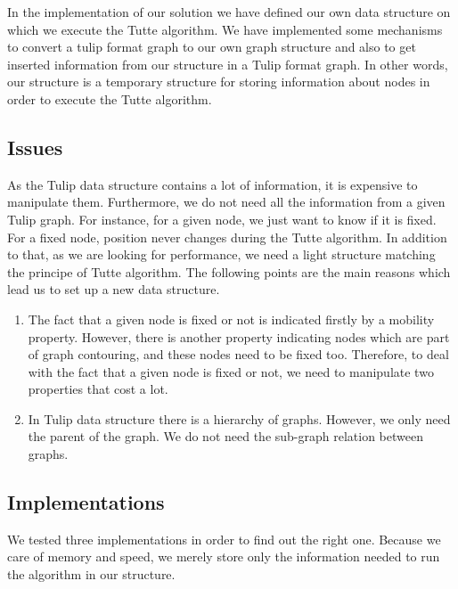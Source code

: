 In the implementation of our solution we have defined our own data
structure on which we execute the Tutte algorithm. We have
implemented some mechanisms to convert a tulip format graph to our own
graph structure and also to get inserted information from our structure
 in a Tulip format graph. In other words, our structure is a
temporary structure for storing information about nodes in order to
execute the Tutte algorithm.

\subsection{Issues}
As the Tulip data structure contains a lot of information, it is
expensive to manipulate them. Furthermore, we do not need all the
information from a given Tulip graph. For
instance, for a given node, we just want to know if it is fixed. For a
fixed node, position never changes during the Tutte algorithm. In
addition to that, as we are looking for performance, we need a light
structure matching the principe of Tutte algorithm. The following
points are the main reasons which lead us to set up a new data
structure.
\begin{enumerate}
\item The fact that a given node is fixed or not is indicated firstly
  by a mobility property. However, there is another property indicating
  nodes which are part of graph contouring, and these nodes need to be
  fixed too. Therefore, to deal with the fact that a given node is fixed or
  not, we need to manipulate two properties that cost a lot.

\item In Tulip data structure there is a hierarchy of graphs. However, we only need
  the parent of the graph. We do not need the sub-graph relation between graphs.


\end{enumerate}  

\subsection{Implementations}
We tested three implementations in order to find out the right one. Because we care of memory and speed, we merely store only the information needed to run the algorithm in our structure.


